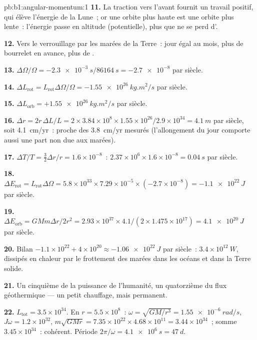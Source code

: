 \begin{solution}{pb:b1:angular-momentum:1}
\textbf{11.} La traction vers l'avant fournit un travail positif, qui
élève l'énergie de la Lune~; or une orbite plus haute est une orbite
plus lente~: l'énergie passe en altitude (potentielle), plus que ne se
perd d'.

\textbf{12.} Vers le verrouillage par les marées de la Terre~: jour égal
au mois, plus de bourrelet en avance, plus de .

\textbf{13.} $\Delta\Omega/\Omega = -\qty{2.3e-3}{s}/\qty{86164}{s} =
\num{-2.7e-8}$ par siècle.

\textbf{14.} $\Delta L_{\text{rot}} = L_{\text{rot}}\Delta\Omega/\Omega =
\qty{-1.55e26}{kg.m^2/s}$ par siècle.

\textbf{15.} $\Delta L_{\text{orb}} = +\qty{1.55e26}{kg.m^2/s}$ par siècle.

\textbf{16.} $\Delta r = 2r\,\Delta L/L = 2 \times 3.84\times10^8 \times 1.55
\times10^{26}/2.9\times10^{34} = \qty{4.1}{m}$ par siècle, soit \qty{4.1}{cm/yr}~:
proche des \qty{3.8}{cm/yr} mesurés (l'allongement du jour comporte aussi
une part non due aux marées).

\textbf{17.} $\Delta T/T = \tfrac32\Delta r/r = 1.6\times10^{-8}$~: $2.37\times
10^6 \times 1.6\times10^{-8} = \qty{0.04}{s}$ par siècle.

\textbf{18.} $\Delta E_{\text{rot}} = L_{\text{rot}}\Delta\Omega = 5.8\times10^{33}
\times 7.29\times10^{-5} \times (-2.7\times10^{-8}) = \qty{-1.1e22}{J}$ par
siècle.

\textbf{19.} $\Delta E_{\text{orb}} = GMm\Delta r/2r^2 = 2.93\times10^{37}
\times 4.1/(2 \times 1.475\times10^{17}) = \qty{+4.1e20}{J}$ par siècle.

\textbf{20.} Bilan $-1.1\times10^{22} + 4\times10^{20} \approx \qty{-1.06e22}{J}$
par siècle~: $3.4\times10^{12}\ \unit{W}$, dissipés en chaleur par le
frottement des marées dans les océans et dans la Terre solide.

\textbf{21.} Un cinquième de la puissance de l'humanité, un quatorzième
du flux géothermique --- un petit chauffage, mais permanent.

\textbf{22.} $L_{\text{tot}} = 3.5\times10^{34}$. En $r = 5.5\times10^8$~:
$\omega = \sqrt{GM/r^3} = \qty{1.55e-6}{rad/s}$, $J\omega = 1.2\times10^{32}$,
$m\sqrt{GMr} = 7.35\times10^{22} \times 4.68\times10^{11} = 3.44\times10^{34}$~;
somme $3.45\times10^{34}$~: cohérent. Période $2\pi/\omega = \qty{4.1e6}{s}
= \qty{47}{d}$.


\end{solution}
